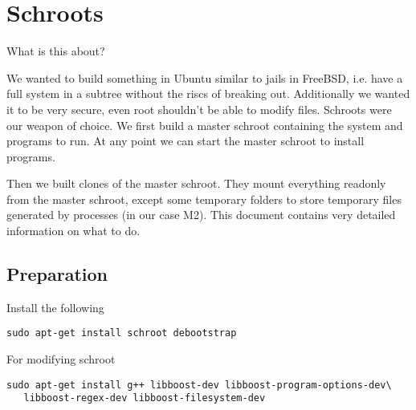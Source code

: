 \documentclass[a4paper]{book}
\begin{document}
\chapter{Schroots}
What is this about?

We wanted to build something in Ubuntu similar to jails in FreeBSD, i.e. have a
full system in a subtree without the riscs of breaking out.  Additionally we
wanted it to be very secure, even root shouldn't be able to modify files.
Schroots were our weapon of choice. We first build a master schroot containing
the system and programs to run. At any point we can start the master schroot to
install programs.

Then we built clones of the master schroot. They mount everything readonly from
the master schroot, except some temporary folders to store temporary files
generated by processes (in our case M2). This document contains very detailed
information on what to do.

\section{Preparation}

Install the following

\begin{verbatim}
sudo apt-get install schroot debootstrap
\end{verbatim}

For modifying schroot

\begin{verbatim}
sudo apt-get install g++ libboost-dev libboost-program-options-dev\
   libboost-regex-dev libboost-filesystem-dev
\end{verbatim}

\end{document}
